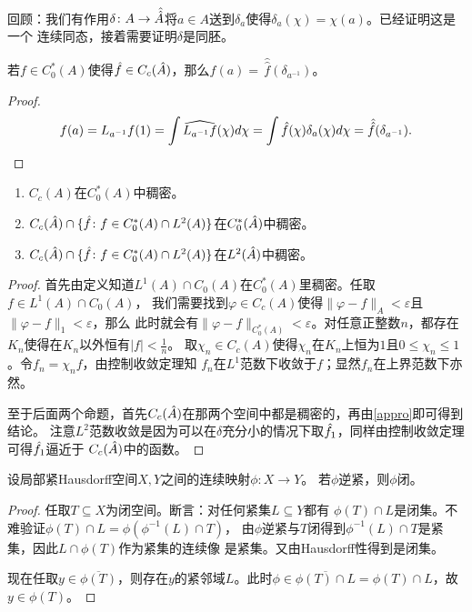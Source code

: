 回顾：我们有作用$\delta \colon A \to \hat{\hat{A}}$将$a \in A$送到$\delta_a$使得$\delta_a(\chi) = \chi(a)$。已经证明这是一个
连续同态，接着需要证明$\delta$是同胚。
\begin{lemma}[Fourier反演公式]
若$f \in C_0^*(A)$使得$\hat{f} \in C_c(\hat{A})$，那么$f(a) = \,\hat{\!\hat{f}}(\delta_{a^{-1}})$。
\end{lemma}
\begin{proof}
    \[f(a) = L_{a^{-1}}f(1) = \int \widehat{L_{a^{-1}}f}(\chi)d\chi 
    = \int \hat{f}(\chi)\delta_a(\chi)d\chi = \hat{\hat{f}}(\delta_{a^{-1}}).\qedhere\]
\end{proof}
\begin{lemma}\label{dualdense}
    \begin{enumerate}
        \item $C_c(A)$在$C_0^*(A)$中稠密。
        \item $C_c(\hat{A}) \cap \{\hat{f} \colon f \in C_0^*(A) \cap L^2(A)\}$在$C_0^*(\hat{A})$中稠密。
        \item $C_c(\hat{A}) \cap \{\hat{f} \colon f \in C_0^*(A) \cap L^2(A)\}$在$L^2(\hat{A})$中稠密。
    \end{enumerate}
\end{lemma}
\begin{proof}
    首先由定义知道$L^1(A) \cap C_0(A)$在$C_0^*(A)$里稠密。任取$f \in L^1(A) \cap C_0(A)$，
    我们需要找到$\varphi \in C_c(A)$使得$\|\varphi - f\|_A < \varepsilon$且$\|\varphi - f\|_1 < \varepsilon$，那么
    此时就会有$\|\varphi - f\|_{C_0^*(A)} < \varepsilon$。对任意正整数$n$，都存在$K_n$使得在$K_n$以外恒有$\displaystyle |f| < \frac{1}{n}$。
    取$\chi_n \in C_c(A)$使得$\chi_n$在$K_n$上恒为$1$且$0 \leqslant \chi_n \leqslant 1$。令$f_n = \chi_nf$，由控制收敛定理知
    $f_n$在$L^1$范数下收敛于$f$；显然$f_n$在上界范数下亦然。

    至于后面两个命题，首先$C_c(\hat{A})$在那两个空间中都是稠密的，再由\ref{appro}即可得到结论。
    注意$L^2$范数收敛是因为可以在$\delta$充分小的情况下取$\hat{f}_1$，同样由控制收敛定理可得$\hat{f}_1$逼近于
    $C_c(\hat{A})$中的函数。
\end{proof}
\begin{lemma}
    设局部紧Hausdorff空间$X,Y$之间的连续映射$\phi \colon X \to Y$。
    若$\phi$逆紧，则$\phi$闭。
\end{lemma}
\begin{proof}
    任取$T\subseteq X$为闭空间。断言：对任何紧集$L \subseteq Y$都有
    $\phi(T) \cap L$是闭集。不难验证$\phi(T) \cap L = \phi(\phi^{-1}(L) \cap T)$，
    由$\phi$逆紧与$T$闭得到$\phi^{-1}(L) \cap T$是紧集，因此$L \cap \phi(T)$作为紧集的连续像
    是紧集。又由Hausdorff性得到是闭集。

    现在任取$y \in \overline{\phi(T)}$，则存在$y$的紧邻域$L$。此时$\phi \in \overline{\phi(T) \cap L} = \phi(T) \cap L$，故$y \in \phi(T)$。
\end{proof}
